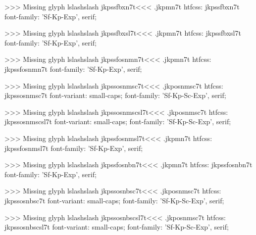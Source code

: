 >>>
Missing glyph	lslashslash
\<jkpssfbxn7t\><<<
.jkpmn7t
htfcss:  jkpssfbxn7t  font-family: 'Sf-Kp-Exp', serif;

>>>
Missing glyph	lslashslash
\<jkpssfbxsl7t\><<<
.jkpmn7t
htfcss:  jkpssfbxsl7t  font-family: 'Sf-Kp-Exp', serif;

>>>
Missing glyph	lslashslash
\<jkpssfosnmn7t\><<<
.jkpmn7t
htfcss:  jkpssfosnmn7t  font-family: 'Sf-Kp-Exp', serif;

>>>
Missing glyph	lslashslash
\<jkpssosnmsc7t\><<<
.jkposnmsc7t
htfcss:  jkpssosnmsc7t  font-variant: small-caps; font-family: 'Sf-Kp-Sc-Exp', serif;

>>>
Missing glyph	lslashslash
\<jkpssosnmscsl7t\><<<
.jkposnmsc7t
htfcss:  jkpssosnmscsl7t  font-variant: small-caps; font-family: 'Sf-Kp-Sc-Exp', serif;

>>>
Missing glyph	lslashslash
\<jkpssfosnmsl7t\><<<
.jkpmn7t
htfcss:  jkpssfosnmsl7t  font-family: 'Sf-Kp-Exp', serif;

>>>
Missing glyph	lslashslash
\<jkpssfosnbn7t\><<<
.jkpmn7t
htfcss:  jkpssfosnbn7t  font-family: 'Sf-Kp-Exp', serif;

>>>
Missing glyph	lslashslash
\<jkpssosnbsc7t\><<<
.jkposnmsc7t
htfcss:  jkpssosnbsc7t  font-variant: small-caps; font-family: 'Sf-Kp-Sc-Exp', serif;

>>>
Missing glyph	lslashslash
\<jkpssosnbscsl7t\><<<
.jkposnmsc7t
htfcss:  jkpssosnbscsl7t  font-variant: small-caps; font-family: 'Sf-Kp-Sc-Exp', serif;

